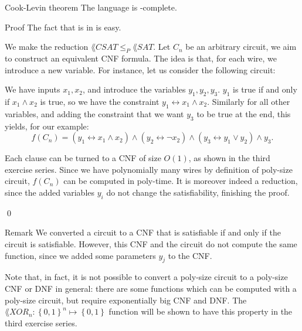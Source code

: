 \documentclass[a4paper]{article}
\begin{document}
\begin{parag}{Cook-Levin theorem}
    The language  is -complete.

    \begin{subparag}{Proof}
        The fact that  is in  is easy. 

        We make the reduction $\lang{CSAT} \leq_P \lang{SAT}$. Let $C_n$ be an arbitrary circuit, we aim to construct an equivalent CNF formula. The idea is that, for each wire, we introduce a new variable. For instance, let us consider the following circuit:

        We have inputs $x_1, x_2$, and introduce the variables $y_1, y_2, y_3$. $y_1$ is true if and only if $x_1 \land x_2$ is true, so we have the constraint $y_1 \leftrightarrow x_1 \land x_2$. Similarly for all other variables, and adding the constraint that we want $y_3$ to be true at the end, this yields, for our example: 
        \[f\left(C_n\right) = \left(y_1 \leftrightarrow x_1 \land x_2\right) \land \left(y_2 \leftrightarrow \lnot x_2\right) \land \left(y_3 \leftrightarrow y_1 \lor y_2\right) \land y_3.\]

        Each clause can be turned to a CNF of size $O\left(1\right)$, as shown in the third exercise series. Since we have polynomially many wires by definition of poly-size circuit, $f\left(C_n\right)$ can be computed in poly-time. It is moreover indeed a reduction, since the added variables $y_i$ do not change the satisfiability, finishing the proof.

        \qed
    \end{subparag}

    \begin{subparag}{Remark}
        We converted a circuit to a CNF that is satisfiable if and only if the circuit is satisfiable. However, this CNF and the circuit do not compute the same function, since we added some parameters $y_j$ to the CNF.

        Note that, in fact, it is not possible to convert a poly-size circuit to a poly-size CNF or DNF in general: there are some functions which can be computed with a poly-size circuit, but require exponentially big CNF and DNF. The $\lang{XOR}_n: \left\{0, 1\right\}^n \mapsto \left\{0,1\right\}$ function will be shown to have this property in the third exercise series.
    \end{subparag}
\end{parag}
\end{document}
